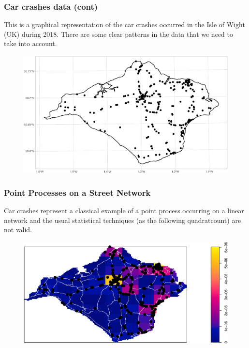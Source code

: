 \documentclass[c,10pt,pdftex]{beamer}
\begin{document}
\begin{frame}
\frametitle{Car crashes data (cont)}
\vspace{-0.25cm}
This is a graphical representation of the car crashes occurred in the Isle of Wight (UK) during 2018. There are some clear patterns in the data that we need to take into account.
\begin{figure}
	\centering
	\includegraphics[width=\linewidth]{images/iow_crashes}
\end{figure}
\end{frame}

\begin{frame}
\frametitle{Point Processes on a Street Network}
\vspace{-0.25cm}
Car crashes represent a classical example of a point process occurring on a linear network and the usual statistical techniques (as the following quadratcount) are not valid. 
\vspace{-0.5cm}
\begin{figure}
	\centering
	\includegraphics[width=\linewidth]{images/quadratcount2}
\end{figure}
\end{frame}
\end{document}
